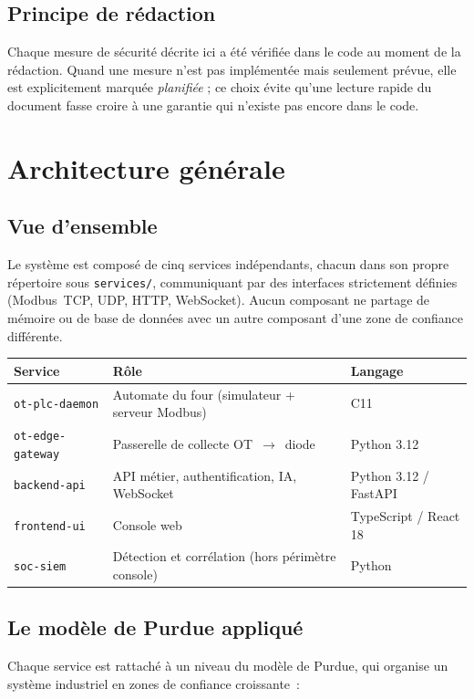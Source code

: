 \documentclass[11pt,a4paper]{report}
\begin{document}
\section{Principe de rédaction}
Chaque mesure de sécurité décrite ici a été vérifiée dans le code au moment de
la rédaction. Quand une mesure n'est pas implémentée mais seulement prévue,
elle est explicitement marquée \emph{planifiée} ; ce choix évite qu'une lecture
rapide du document fasse croire à une garantie qui n'existe pas encore dans le
code.

\chapter{Architecture générale}

\section{Vue d'ensemble}
Le système est composé de cinq services indépendants, chacun dans son propre
répertoire sous \texttt{services/}, communiquant par des interfaces strictement
définies (Modbus~TCP, UDP, HTTP, WebSocket). Aucun composant ne partage de
mémoire ou de base de données avec un autre composant d'une zone de confiance
différente.

\begin{center}
\begin{tabular}{@{}lll@{}}
\toprule
\textbf{Service} & \textbf{Rôle} & \textbf{Langage} \\
\midrule
\texttt{ot-plc-daemon} & Automate du four (simulateur + serveur Modbus) & C11 \\
\texttt{ot-edge-gateway} & Passerelle de collecte OT~$\rightarrow$~diode & Python 3.12 \\
\texttt{backend-api} & API métier, authentification, IA, WebSocket & Python 3.12 / FastAPI \\
\texttt{frontend-ui} & Console web & TypeScript / React 18 \\
\texttt{soc-siem} & Détection et corrélation (hors périmètre console) & Python \\
\bottomrule
\end{tabular}
\end{center}

\section{Le modèle de Purdue appliqué}
Chaque service est rattaché à un niveau du modèle de Purdue, qui organise un
système industriel en zones de confiance croissante~:
\end{document}
